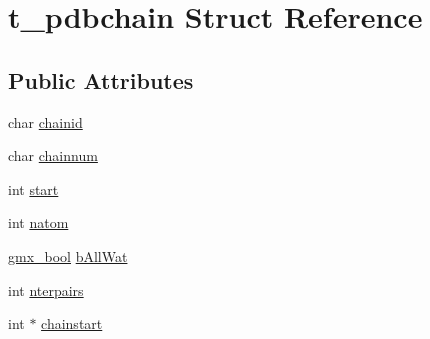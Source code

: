 \hypertarget{structt__pdbchain}{\section{t\-\_\-pdbchain \-Struct \-Reference}
\label{structt__pdbchain}
}
\subsection*{\-Public \-Attributes}
\begin{DoxyCompactItemize}
\item 
char \hyperlink{structt__pdbchain_a47574a6ffec32fe45b0002ee0de11745}{chainid}
\item 
char \hyperlink{structt__pdbchain_ad7aba8e3ef88f3697c4363f5d8bd36a1}{chainnum}
\item 
int \hyperlink{structt__pdbchain_adbee6a4c32a18995ac95e9778f9437e4}{start}
\item 
int \hyperlink{structt__pdbchain_ae0c1a673530f2c55f490a3b71e7b2b20}{natom}
\item 
\hyperlink{include_2types_2simple_8h_a8fddad319f226e856400d190198d5151}{gmx\-\_\-bool} \hyperlink{structt__pdbchain_a5a44e5990cca32bcdbc06ac29817375b}{b\-All\-Wat}
\item 
int \hyperlink{structt__pdbchain_ae5a92c7963e9a55dad9108b62d430739}{nterpairs}
\item 
int $\ast$ \hyperlink{structt__pdbchain_a35bc979d3b945382b16b03c170c570a7}{chainstart}
\end{DoxyCompactItemize}


